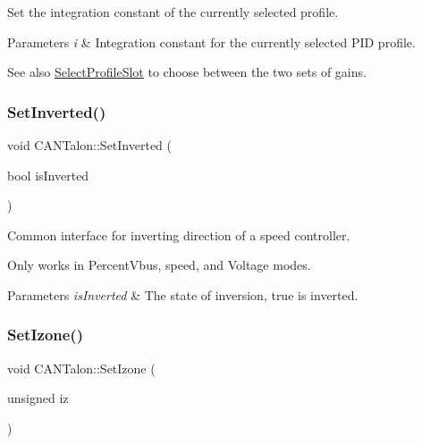 Set the integration constant of the currently selected profile.


\begin{DoxyParams}{Parameters}
{\em i} & Integration constant for the currently selected P\+ID profile. \\
\hline
\end{DoxyParams}
\begin{DoxySeeAlso}{See also}
\hyperlink{class_c_a_n_talon_a0f478462884ed5e541179821c44b724f}{Select\+Profile\+Slot} to choose between the two sets of gains. 
\end{DoxySeeAlso}
\mbox{\label{class_c_a_n_talon_ab153d39a2a439189af4667ce0364e846}} 
\subsubsection{\texorpdfstring{Set\+Inverted()}{SetInverted()}}
{\footnotesize\ttfamily void C\+A\+N\+Talon\+::\+Set\+Inverted (\begin{DoxyParamCaption}\item[{bool}]{is\+Inverted }\end{DoxyParamCaption})\hspace{0.3cm}{\ttfamily [override]}}

Common interface for inverting direction of a speed controller.

Only works in Percent\+Vbus, speed, and Voltage modes.


\begin{DoxyParams}{Parameters}
{\em is\+Inverted} & The state of inversion, true is inverted. \\
\hline
\end{DoxyParams}
\mbox{\label{class_c_a_n_talon_a232b637087900eac7272450015c2be04}} 
\subsubsection{\texorpdfstring{Set\+Izone()}{SetIzone()}}
{\footnotesize\ttfamily void C\+A\+N\+Talon\+::\+Set\+Izone (\begin{DoxyParamCaption}\item[{unsigned}]{iz }\end{DoxyParamCaption})}


